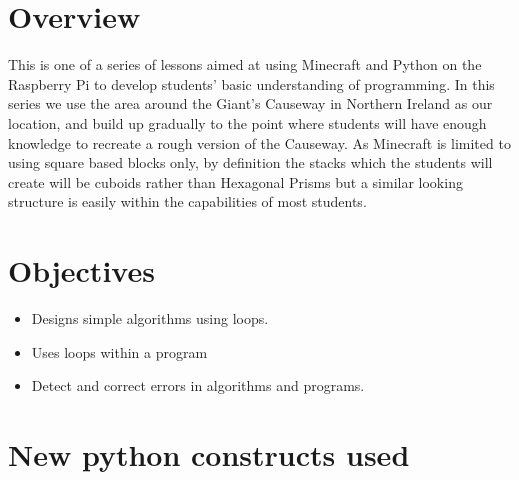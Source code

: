 \documentclass{geocraft-lesson-plan}
\begin{document}
\subtitle{Part 2 - Iteration}

\section*{Overview} This is one of a series of lessons aimed at using Minecraft and Python on the Raspberry Pi to
develop students' basic understanding of programming. In this series we use the area around the Giant's Causeway in
Northern Ireland as our location, and build up gradually to the point where students will have enough knowledge to
recreate a rough version of the Causeway. As Minecraft is limited to using square based blocks only, by definition the
stacks which the students will create will be cuboids rather than Hexagonal Prisms but a similar looking structure is
easily within the capabilities of most students.

\section*{Objectives}
\begin{itemize}
\item Designs simple algorithms using loops.
\item Uses loops within a program
\item Detect and correct errors in algorithms and programs.
\end{itemize}



\section*{New python constructs used}
\end{document}
